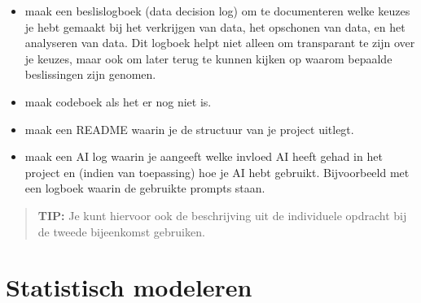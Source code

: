 \documentclass[
  letterpaper,
  DIV=11,
  numbers=noendperiod]{scrreprt}
\providecommand{\tightlist}{%
  \setlength{\itemsep}{0pt}\setlength{\parskip}{0pt}}
\begin{document}
\begin{itemize}
\tightlist
\item
  maak een beslislogboek (data decision log) om te documenteren welke
  keuzes je hebt gemaakt bij het verkrijgen van data, het opschonen van
  data, en het analyseren van data. Dit logboek helpt niet alleen om
  transparant te zijn over je keuzes, maar ook om later terug te kunnen
  kijken op waarom bepaalde beslissingen zijn genomen.
\item
  maak codeboek als het er nog niet is.
\item
  maak een README waarin je de structuur van je project uitlegt.
\item
  maak een AI log waarin je aangeeft welke invloed AI heeft gehad in het
  project en (indien van toepassing) hoe je AI hebt gebruikt.
  Bijvoorbeeld met een logboek waarin de gebruikte prompts staan.
\end{itemize}

\begin{quote}
\textbf{TIP:} Je kunt hiervoor ook de beschrijving uit de individuele
opdracht bij de tweede bijeenkomst gebruiken.
\end{quote}


\chapter{Statistisch modeleren}\label{sec-mt5}
\end{document}
